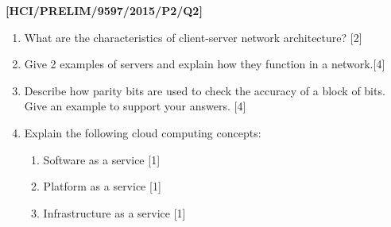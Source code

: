 \item \textbf{{[}HCI/PRELIM/9597/2015/P2/Q2{]} }
\begin{enumerate}
\item What are the characteristics of client-server network architecture?
\hfill{}{[}2{]} 
\item Give 2 examples of servers and explain how they function in a network.\hfill{}{[}4{]} 
\item Describe how parity bits are used to check the accuracy of a block
of bits. Give an example to support your answers. \hfill{}{[}4{]} 
\item Explain the following cloud computing concepts: 
\begin{enumerate}
\item Software as a service \hfill{}{[}1{]}
\item Platform as a service \hfill{}{[}1{]}
\item Infrastructure as a service \hfill{}{[}1{]}
\end{enumerate}
\end{enumerate}